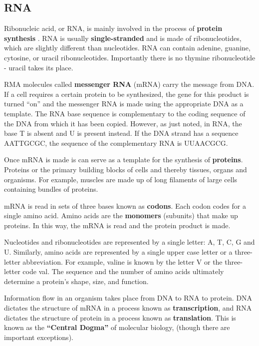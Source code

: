 \documentclass[
]{book}
\begin{document}
\hypertarget{rna}{%
\subsection{RNA}\label{rna}}

Ribonucleic acid, or RNA, is mainly involved in the process of \textbf{protein
synthesis} . RNA is usually \textbf{single-stranded} and is made of
ribonucleotides, which are slightly different than nucleotides. RNA can
contain adenine, guanine, cytosine, or uracil ribonucleotides.
Importantly there is no thymine ribonucleotide - uracil takes its place.

RMA molecules called \textbf{messenger RNA} (mRNA) carry the message from
DNA. If a cell requires a certain protein to be synthesized, the gene
for this product is turned ``on'' and the messenger RNA is made using the
appropriate DNA as a template. The RNA base sequence is complementary to
the coding sequence of the DNA from which it has been copied. However,
as just noted, in RNA, the base T is absent and U is present instead. If
the DNA strand has a sequence AATTGCGC, the sequence of the
complementary RNA is UUAACGCG.

Once mRNA is made is can serve as a template for the synthesis of
\textbf{proteins}. Proteins or the primary building blocks of cells and
thereby tissues, organs and organisms. For example, muscles are made up
of long filaments of large cells containing bundles of proteins.

mRNA is read in sets of three bases known as \textbf{codons}. Each codon
codes for a single amino acid. Amino acids are the \textbf{monomers}
(subunits) that make up proteins. In this way, the mRNA is read and the
protein product is made.

Nucleotides and ribonucleotides are represented by a single letter: A,
T, C, G and U. Similarly, amino acids are represented by a single upper
case letter or a three-letter abbreviation. For example, valine is known
by the letter V or the three-letter code val. The sequence and the
number of amino acids ultimately determine a protein's shape, size, and
function.

Information flow in an organism takes place from DNA to RNA to protein.
DNA dictates the structure of mRNA in a process known as
\textbf{transcription}, and RNA dictates the structure of protein in a
process known as \textbf{translation}. This is known as the \textbf{``Central
Dogma''} of molecular biology, (though there are important exceptions).
\end{document}
